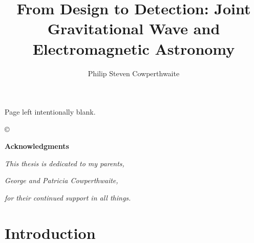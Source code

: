\documentclass[bound]{hvdthesis}
\author{Philip Steven Cowperthwaite}
\title{From Design to Detection: Joint Gravitational Wave and Electromagnetic Astronomy}
\begin{document}
% 

\clearpage
\thispagestyle{empty}
\begin{center}
\vspace*{\fill}
Page left intentionally blank.
\vspace*{\fill}
\end{center}

\frontmatter

\makecover
\copyright

%
{\singlespace
\tableofcontents
}
\newpage
\clearpage


\newpage
%
\thispagestyle{plain}

\vskip 0.5cm
{\centerline {\Large \bf Acknowledgments}}
\vskip 0.5cm
\normalsize




\clearpage
%
\thispagestyle{plain}

\vspace*{\fill}
{\centerline {\em This thesis is dedicated to my parents,}}
\vskip 1.5cm
{\centerline {\em George and Patricia Cowperthwaite,}}
\vskip 1.5cm
{\centerline {\em for their continued support in all things.}}
\vspace*{\fill}


\mainmatter
\pagestyle{fancy}


%
%

\chapter[Introduction]{Introduction}\label{c:intro}

\clearpage
%
\end{document}
